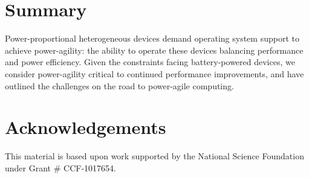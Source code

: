 \section{Summary}

Power-proportional heterogeneous devices demand operating system support to
achieve power-agility: the ability to operate these devices balancing
performance and power efficiency. Given the constraints facing
battery-powered devices, we consider power-agility critical to continued
performance improvements, and have outlined the challenges on the road to
power-agile computing.

\section*{Acknowledgements}

This material is based upon work supported by the National Science Foundation
under Grant \# CCF-1017654.
